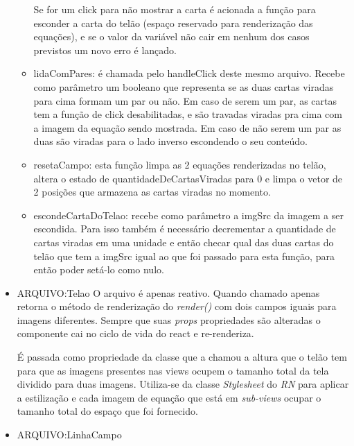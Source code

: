 \begin{itemize}
\begin{itemize}
Se for um click para não mostrar a carta é acionada a função para esconder a carta do telão (espaço reservado para renderização das equações), e se o valor da variável não cair em nenhum dos casos previstos um novo erro é lançado.

	\item lidaComPares: é chamada pelo handleClick deste mesmo arquivo. Recebe como parâmetro um booleano que representa se as duas cartas viradas para cima formam um par ou não. Em caso de serem um par, as cartas tem a função de click desabilitadas, e são travadas viradas pra cima com a imagem da equação sendo mostrada. Em caso de não serem um par as duas são viradas para o lado inverso escondendo o seu conteúdo. 

	\item resetaCampo: esta função limpa as 2 equações renderizadas no telão, altera o estado de quantidadeDeCartasViradas para 0 e limpa o vetor de 2 posições que armazena as cartas viradas no momento.

	\item escondeCartaDoTelao: recebe como parâmetro a imgSrc da imagem a ser escondida. Para isso também é necessário decrementar a quantidade de cartas viradas em uma unidade e então checar qual das duas cartas do telão que tem a imgSrc igual ao que foi passado para esta função, para então poder setá-lo como nulo. 

	\end{itemize}
\end{itemize}

\begin{itemize}
\item ARQUIVO:Telao
O arquivo é apenas reativo. Quando chamado apenas retorna o método de renderização do \textit{render()} com dois campos iguais para imagens diferentes. Sempre que suas \textit{props} propriedades são alteradas o componente cai no ciclo de vida do react e re-renderiza. 

É passada como propriedade da classe que a chamou a altura que o telão tem para que as imagens presentes nas views ocupem o tamanho total da tela dividido para duas imagens. 
Utiliza-se da classe \textit{Stylesheet} do \textit{RN} para aplicar a estilização e cada imagem de equação que está em \textit{sub-views}  ocupar o tamanho total do espaço que foi fornecido.

\end{itemize}	


\begin{itemize}
\item ARQUIVO:LinhaCampo
\end{itemize}

